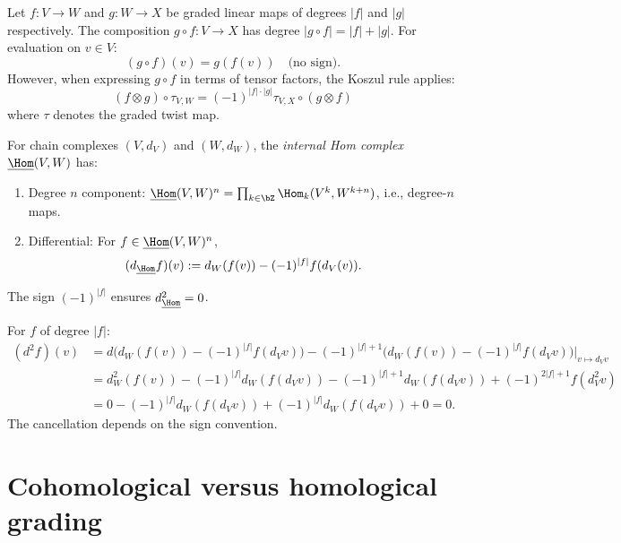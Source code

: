 \begin{lemma}
\label{lem:composition-signs}
Let $f: V \to W$ and $g: W \to X$ be graded linear maps of degrees $|f|$
and $|g|$ respectively. The composition $g \circ f: V \to X$ has degree
$|g \circ f| = |f| + |g|$. For evaluation on $v \in V$:
\[
(g \circ f)(v) = g(f(v)) \quad \text{(no sign)}.
\]
However, when expressing $g \circ f$ in terms of tensor factors, the
Koszul rule applies:
\[
(f \otimes g) \circ \tau_{V,W} = (-1)^{|f| \cdot |g|} \tau_{V,X} \circ (g \otimes f)
\]
where $\tau$ denotes the graded twist map.
\end{lemma}

\begin{definition}
\label{def:graded-hom}
For chain complexes $(V, d_V)$ and $(W, d_W)$, the \emph{internal Hom complex}
$\underline{\Hom}(V, W)$ has:
\begin{enumerate}[label=(\roman*)]
\item Degree $n$ component: $\underline{\Hom}(V, W)^n = \prod_{k \in \bZ}
\Hom_k(V^k, W^{k+n})$, i.e., degree-$n$ maps.
\item Differential: For $f \in \underline{\Hom}(V, W)^n$,
\[
(d_{\underline{\Hom}} f)(v) := d_W(f(v)) - (-1)^{|f|} f(d_V(v)).
\]
\end{enumerate}
The sign $(-1)^{|f|}$ ensures $d_{\underline{\Hom}}^2 = 0$.
\end{definition}

\begin{computation}[\texorpdfstring{$d_{\underline{\Hom}}^2 = 0$}{d\_Hom\textasciicircum 2 = 0}]
\label{ver:d-hom-squared}
For $f$ of degree $|f|$:
\begin{align*}
(d^2 f)(v) &= d\bigl( d_W(f(v)) - (-1)^{|f|} f(d_V v) \bigr)
 - (-1)^{|f|+1} \bigl( d_W(f(v)) - (-1)^{|f|} f(d_V v) \bigr)|_{v \mapsto d_V v} \\
&= d_W^2(f(v)) - (-1)^{|f|} d_W(f(d_V v))
 - (-1)^{|f|+1} d_W(f(d_V v)) + (-1)^{2|f|+1} f(d_V^2 v) \\
&= 0 - (-1)^{|f|} d_W(f(d_V v)) + (-1)^{|f|} d_W(f(d_V v)) + 0 = 0.
\end{align*}
The cancellation depends on the sign convention.
\end{computation}


\section{Cohomological versus homological grading}
\label{sec:cohom-vs-homol}


